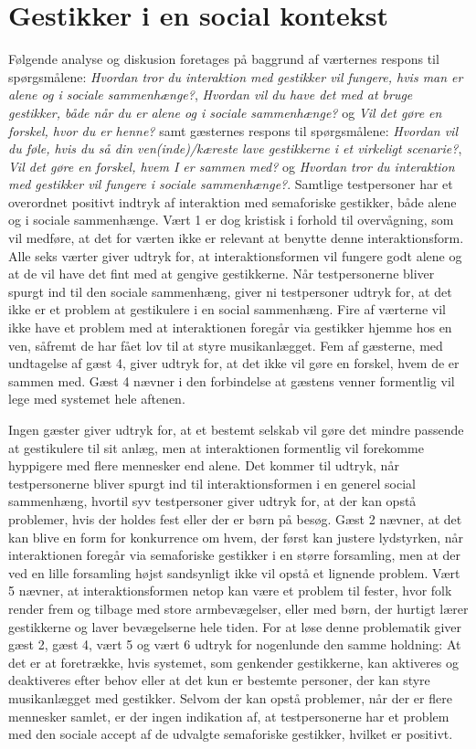 \section{Gestikker i en social kontekst}
\label{TestresultaterSocialAcceptSocial}
%
Følgende analyse og diskusion foretages på baggrund af værternes respons til spørgsmålene: \textit{Hvordan tror du interaktion med gestikker vil fungere, hvis man er alene og i sociale sammenhænge?}, \textit{Hvordan vil du have det med at bruge gestikker, både når du er alene og i sociale sammenhænge?} og \textit{Vil det gøre en forskel, hvor du er henne?} samt gæsternes respons til spørgsmålene: \textit{Hvordan vil du føle, hvis du så din ven(inde)/kæreste lave gestikkerne i et virkeligt scenarie?}, \textit{Vil det gøre en forskel, hvem I er sammen med?} og \textit{Hvordan tror du interaktion med gestikker vil fungere i sociale sammenhænge?}. \blankline
%
Samtlige testpersoner har et overordnet positivt indtryk af interaktion med semaforiske gestikker, både alene og i sociale sammenhænge. Vært 1 er dog kristisk i forhold til overvågning, som vil medføre, at det for værten ikke er relevant at benytte denne interaktionsform. Alle seks værter giver udtryk for, at interaktionsformen vil fungere godt alene og at de vil have det fint med at gengive gestikkerne. Når testpersonerne bliver spurgt ind til den sociale sammenhæng, giver ni testpersoner udtryk for, at det ikke er et problem at gestikulere i en social sammenhæng. Fire af værterne vil ikke have et problem med at interaktionen foregår via gestikker hjemme hos en ven, såfremt de har fået lov til at styre musikanlægget. Fem af gæsterne, med undtagelse af gæst 4, giver udtryk for, at det ikke vil gøre en forskel, hvem de er sammen med. Gæst 4 nævner i den forbindelse at gæstens venner formentlig vil lege med systemet hele aftenen. 

Ingen gæster giver udtryk for, at et bestemt selskab vil gøre det mindre passende at gestikulere til sit anlæg, men at interaktionen formentlig vil forekomme hyppigere med flere mennesker end alene. Det kommer til udtryk, når testpersonerne bliver spurgt ind til interaktionsformen i en generel social sammenhæng, hvortil syv testpersoner giver udtryk for, at der kan opstå problemer, hvis der holdes fest eller der er børn på besøg. Gæst 2 nævner, at det kan blive en form for konkurrence om hvem, der først kan justere lydstyrken, når interaktionen foregår via semaforiske gestikker i en større forsamling, men at der ved en lille forsamling højst sandsynligt ikke vil opstå et lignende problem. Vært 5 nævner, at interaktionsformen netop kan være et problem til fester, hvor folk render frem og tilbage med store armbevægelser, eller med børn, der hurtigt lærer gestikkerne og laver bevægelserne hele tiden. For at løse denne problematik giver gæst 2, gæst 4, vært 5 og vært 6 udtryk for nogenlunde den samme holdning: At det er at foretrække, hvis systemet, som genkender gestikkerne, kan aktiveres og deaktiveres efter behov eller at det kun er bestemte personer, der kan styre musikanlægget med gestikker. Selvom der kan opstå problemer, når der er flere mennesker samlet, er der ingen indikation af, at testpersonerne har et problem med den sociale accept af de udvalgte semaforiske gestikker, hvilket er positivt. 


